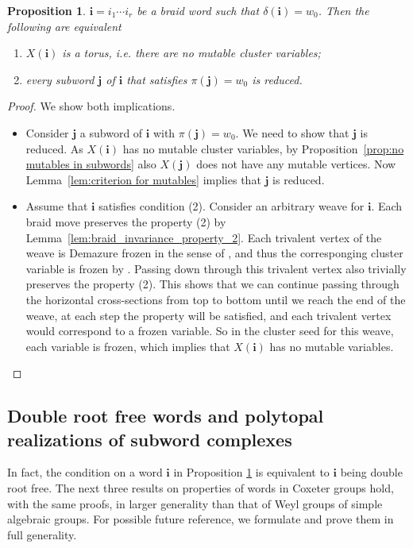 \documentclass[a4paper, 11pt]{amsart}
\newcommand{\word}[1]{\mathbf{#1}}
\newtheorem{proposition}[theorem]{Proposition}%
\theoremstyle{definition}
\begin{document}
\begin{proposition}
\label{prop:torus_no_nonreduced}
$\word{i} = {i_1}\cdots {i_r}$ be a braid word such that $\delta(\word{i})=w_0$. Then the following are equivalent
\begin{enumerate}
    \item $X(\word{i})$ is a torus, \emph{i.e.} there are no mutable cluster variables;
    \item every subword $\word{j}$ of $\word{i}$ that satisfies $\pi(\word{j})=w_0$ is reduced.   
\end{enumerate}
\end{proposition}
\begin{proof} We show both implications.
\begin{itemize}
    \item[(1) $\Rightarrow$ (2)] 
Consider $\word{j}$ a subword of $\word{i}$ with $\pi(\word{j})=w_0$. We need to show that $\word{j}$ is reduced.
As $X(\word{i})$ has no mutable cluster variables, by Proposition~\ref{prop:no mutables in subwords} also $X(\word{j})$ does not have any mutable vertices.
Now Lemma~\ref{lem:criterion for mutables} implies that $\word{j}$ is reduced.

\item[(2) $\Rightarrow$ (1)] 
Assume that $\word{i}$  satisfies condition (2). Consider an arbitrary weave for $\word{i}$. Each braid move preserves the property (2) by Lemma~\ref{lem:braid_invariance_property_2}. Each trivalent vertex of the weave is Demazure frozen in the sense of \cite[Section 7.1]{CGGLSS}, and thus the corresponging cluster variable is frozen by \cite[Lemma 7.2]{CGGLSS}. Passing down through this trivalent vertex also trivially preserves the property (2). This shows that we can continue passing through the horizontal cross-sections from top to bottom until we reach the end of the weave, at each step the property will be satisfied, and each trivalent vertex would correspond to a frozen variable. So in the cluster seed for this weave, each variable is frozen, which implies that $X(\word{i})$ has no mutable variables.
\end{itemize}
\end{proof}

\subsection{Double root free words and polytopal realizations of subword complexes} In fact, the condition on a word $\word{i}$ in Proposition \ref{prop:torus_no_nonreduced} is equivalent to $\word{i}$ being double root free. The next three results on properties of words in Coxeter groups hold, with the same proofs, in larger generality than that of Weyl groups of simple algebraic groups. For possible future reference, we formulate and prove them in full generality.
\end{document}
